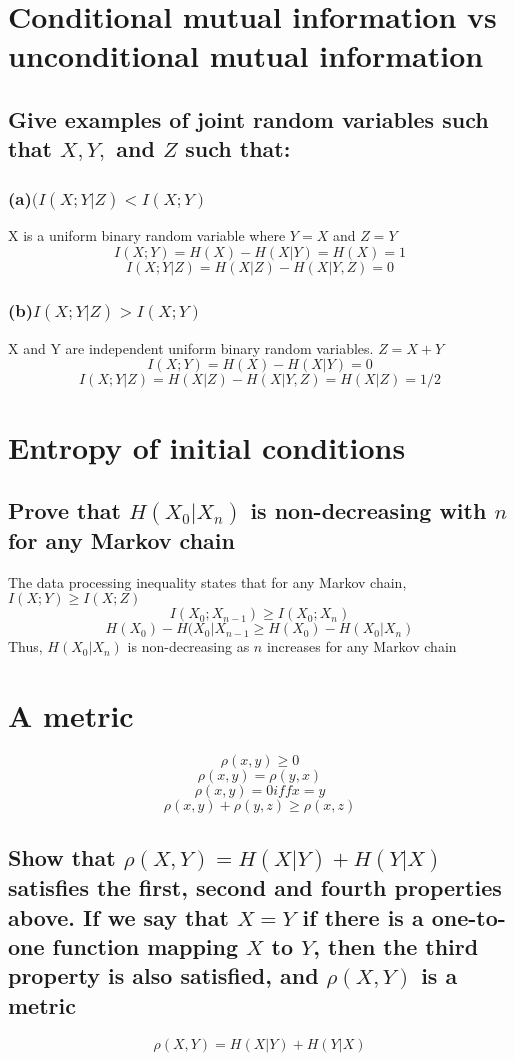 \documentclass[11pt, oneside]{book}   	%
\begin{document}
\section{Conditional mutual information vs unconditional mutual information}
\subsection{Give examples of joint random variables such that $X, Y,$ and $Z$ such that:}
\subsubsection{(a)$(I(X;Y|Z) < I(X;Y)$}
X is a uniform binary random variable where $Y=X$ and $Z=Y$
$$I(X;Y) = H(X) - H(X|Y) = H(X) = 1$$
$$I(X;Y|Z) = H(X|Z)-H(X|Y,Z) = 0$$
\subsubsection{(b)$I(X;Y|Z) > I(X;Y)$}
X and Y are independent uniform binary random variables.  $Z = X+Y$
$$I(X;Y)= H(X) - H(X|Y) = 0$$
$$I(X;Y|Z)=H(X|Z)-H(X|Y,Z) = H(X|Z) = 1/2$$

\section{Entropy of initial conditions}
\subsection{Prove that $H(X_0|X_n)$ is non-decreasing with $n$ for any Markov chain}
The data processing inequality states that for any Markov chain, $I(X;Y) \geq I(X;Z)$
$$I(X_0;X_{n-1}) \geq I(X_0;X_n)$$
$$H(X_0)-H(X_0|X_{n-1} \geq H(X_0)-H(X_0|X_n)$$
Thus, $H(X_0|X_n)$ is non-decreasing as $n$ increases for any Markov chain

\section{A metric}
$$\rho(x,y) \geq 0$$
$$\rho(x,y) = \rho(y,x)$$
$$\rho(x,y) = 0 iff x=y$$
$$\rho(x,y)+\rho(y,z) \geq \rho(x,z)$$
\subsection{Show that $\rho (X,Y) = H(X|Y) + H(Y|X)$ satisfies the first, second and fourth properties above.  If we say that $X=Y$ if there is a one-to-one function mapping $X$ to $Y$, then the third property is also satisfied, and $\rho (X,Y)$ is a metric}
$$\rho(X,Y)=H(X|Y)+H(Y|X)$$
\end{document}
